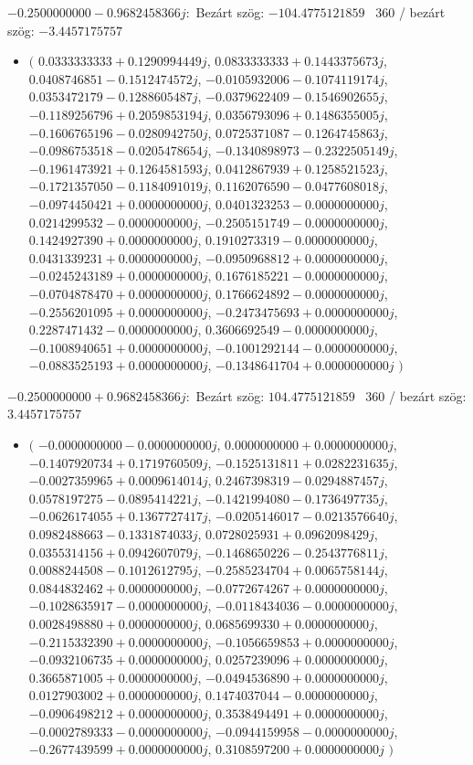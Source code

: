 \documentclass[14pt,a4paper]{article}
\begin{document}
$-0.2500000000-0.9682458366j$:\
Bezárt szög: $-104.4775121859$ \
360 / bezárt szög: $-3.4457175757$\
\begin{itemize}
\item
$\big($
$0.0333333333+0.1290994449j$, $0.0833333333+0.1443375673j$, $0.0408746851-0.1512474572j$, $-0.0105932006-0.1074119174j$, $0.0353472179-0.1288605487j$, $-0.0379622409-0.1546902655j$, $-0.1189256796+0.2059853194j$, $0.0356793096+0.1486355005j$, $-0.1606765196-0.0280942750j$, $0.0725371087-0.1264745863j$, $-0.0986753518-0.0205478654j$, $-0.1340898973-0.2322505149j$, $-0.1961473921+0.1264581593j$, $0.0412867939+0.1258521523j$, $-0.1721357050-0.1184091019j$, $0.1162076590-0.0477608018j$, $-0.0974450421+0.0000000000j$, $0.0401323253-0.0000000000j$, $0.0214299532-0.0000000000j$, $-0.2505151749-0.0000000000j$, $0.1424927390+0.0000000000j$, $0.1910273319-0.0000000000j$, $0.0431339231+0.0000000000j$, $-0.0950968812+0.0000000000j$, $-0.0245243189+0.0000000000j$, $0.1676185221-0.0000000000j$, $-0.0704878470+0.0000000000j$, $0.1766624892-0.0000000000j$, $-0.2556201095+0.0000000000j$, $-0.2473475693+0.0000000000j$, $0.2287471432-0.0000000000j$, $0.3606692549-0.0000000000j$, $-0.1008940651+0.0000000000j$, $-0.1001292144-0.0000000000j$, $-0.0883525193+0.0000000000j$, $-0.1348641704+0.0000000000j$
$\big)$
\end{itemize}
$-0.2500000000+0.9682458366j$:\
Bezárt szög: $104.4775121859$ \
360 / bezárt szög: $3.4457175757$\
\begin{itemize}
\item
$\big($
$-0.0000000000-0.0000000000j$, $0.0000000000+0.0000000000j$, $-0.1407920734+0.1719760509j$, $-0.1525131811+0.0282231635j$, $-0.0027359965+0.0009614014j$, $0.2467398319-0.0294887457j$, $0.0578197275-0.0895414221j$, $-0.1421994080-0.1736497735j$, $-0.0626174055+0.1367727417j$, $-0.0205146017-0.0213576640j$, $0.0982488663-0.1331874033j$, $0.0728025931+0.0962098429j$, $0.0355314156+0.0942607079j$, $-0.1468650226-0.2543776811j$, $0.0088244508-0.1012612795j$, $-0.2585234704+0.0065758144j$, $0.0844832462+0.0000000000j$, $-0.0772674267+0.0000000000j$, $-0.1028635917-0.0000000000j$, $-0.0118434036-0.0000000000j$, $0.0028498880+0.0000000000j$, $0.0685699330+0.0000000000j$, $-0.2115332390+0.0000000000j$, $-0.1056659853+0.0000000000j$, $-0.0932106735+0.0000000000j$, $0.0257239096+0.0000000000j$, $0.3665871005+0.0000000000j$, $-0.0494536890+0.0000000000j$, $0.0127903002+0.0000000000j$, $0.1474037044-0.0000000000j$, $-0.0906498212+0.0000000000j$, $0.3538494491+0.0000000000j$, $-0.0002789333-0.0000000000j$, $-0.0944159958-0.0000000000j$, $-0.2677439599+0.0000000000j$, $0.3108597200+0.0000000000j$
$\big)$
\end{itemize}
\end{document}
